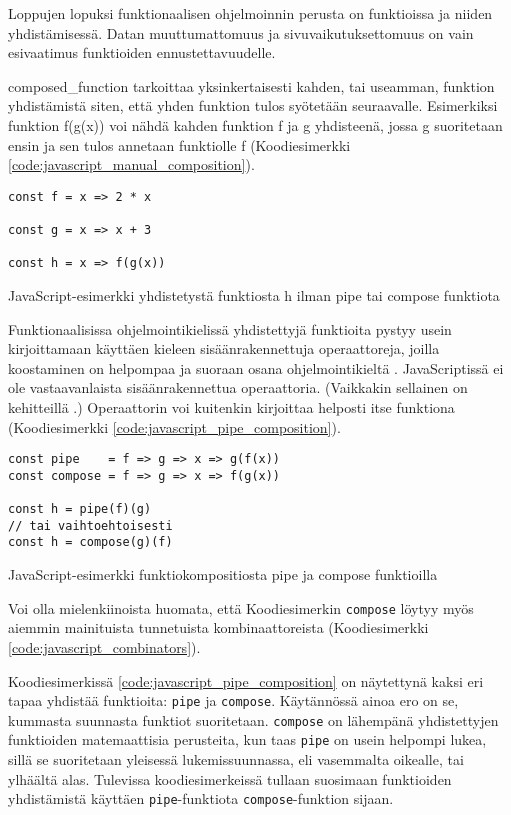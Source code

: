 Loppujen lopuksi funktionaalisen ohjelmoinnin perusta on funktioissa ja niiden yhdistämisessä. Datan muuttumattomuus ja sivuvaikutuksettomuus on vain esivaatimus funktioiden ennustettavuudelle.

\Gls{composed_function} tarkoittaa yksinkertaisesti kahden, tai useamman, funktion yhdistämistä siten, että yhden funktion tulos syötetään seuraavalle. Esimerkiksi funktion f(g(x)) voi nähdä kahden funktion f ja g yhdisteenä, jossa g suoritetaan ensin ja sen tulos annetaan funktiolle f (Koodiesimerkki \ref{code:javascript_manual_composition}).

\begin{code}
    \begin{verbatim}
const f = x => 2 * x

const g = x => x + 3

const h = x => f(g(x))
\end{verbatim}
    \caption{JavaScript-esimerkki yhdistetystä funktiosta h ilman pipe tai compose funktiota}
    \label{code:javascript_manual_composition}
\end{code}

Funktionaalisissa ohjelmointikielissä yhdistettyjä funktioita pystyy usein kirjoittamaan käyttäen kieleen sisäänrakennettuja operaattoreja, joilla koostaminen on helpompaa ja suoraan osana ohjelmointikieltä \cite{fsharpcomposition,haskellcomposition}.
JavaScriptissä ei ole vastaavanlaista sisäänrakennettua operaattoria.
(Vaikkakin sellainen on kehitteillä \cite{tc39_pipeline_operator}.)
Operaattorin voi kuitenkin kirjoittaa helposti itse funktiona (Koodiesimerkki \ref{code:javascript_pipe_composition}).

\begin{code}
    \begin{verbatim}
const pipe    = f => g => x => g(f(x))
const compose = f => g => x => f(g(x))

const h = pipe(f)(g)
// tai vaihtoehtoisesti
const h = compose(g)(f)
\end{verbatim}
    \caption{JavaScript-esimerkki funktiokompositiosta pipe ja compose funktioilla}
    \label{code:javascript_pipe_composition}
\end{code}

Voi olla mielenkiinoista huomata, että Koodiesimerkin \texttt{compose} löytyy myös aiemmin mainituista tunnetuista kombinaattoreista (Koodiesimerkki \ref{code:javascript_combinators}).

Koodiesimerkissä \ref{code:javascript_pipe_composition} on näytettynä kaksi eri tapaa yhdistää funktioita: \texttt{pipe} ja \texttt{compose}. Käytännössä ainoa ero on se, kummasta suunnasta funktiot suoritetaan. \texttt{compose} on lähempänä yhdistettyjen funktioiden matemaattisia perusteita, kun taas \texttt{pipe} on usein helpompi lukea, sillä se suoritetaan yleisessä lukemissuunnassa, eli vasemmalta oikealle, tai ylhäältä alas. Tulevissa koodiesimerkeissä tullaan suosimaan funktioiden yhdistämistä käyttäen \texttt{pipe}-funktiota \texttt{compose}-funktion sijaan. \citep{whyprefercompose}

